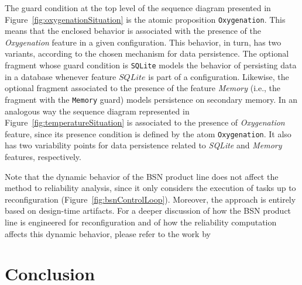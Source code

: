 The guard condition at the top level of the sequence diagram presented in
Figure~\ref{fig:oxygenationSituation} is the atomic proposition
\texttt{Oxygenation}.  This means that the enclosed behavior is associated with
the presence of the \textit{Oxygenation} feature in a given configuration.  This
behavior, in turn, has two variants, according to the chosen mechanism for data
persistence.  The optional fragment whose guard condition is \texttt{SQLite}
models the behavior of persisting data in a database whenever feature $SQLite$
is part of a configuration.  Likewise, the optional fragment associated to the
presence of the feature \textit{Memory} (i.e., the fragment with the
\texttt{Memory} guard) models persistence on secondary memory. In an analogous way the sequence diagram represented in Figure~\ref{fig:temperatureSituation} is associated to the presence of \emph{Oxygenation} feature, since its presence condition is defined by the atom \texttt{Oxygenation}. It also has two variability points for data persistence related to \emph{SQLite} and \emph{Memory} features, respectively.



Note that the dynamic behavior of the BSN product line does not affect the
method to reliability analysis, since it only considers the execution of tasks
up to reconfiguration (Figure~\ref{fig:bsnControlLoop}).  Moreover, the approach
is entirely based on design-time artifacts.  For a deeper discussion of how the
BSN product line is engineered for reconfiguration and of how the reliability
computation affects this dynamic behavior, please refer to the work by
\citet{ReliableAndMaintainableDSPL}









\section{Conclusion \label{sec:backgroundConclusion}}

